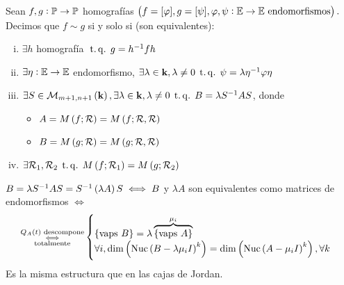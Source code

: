 \begin{defi}
	Sean $f, g : \mathbb{P} \to \mathbb{P}$ homografías $\left( f = [\varphi], g = [\psi], \varphi, \psi : \mathbb{E} \to \mathbb{E} \text{ endomorfismos}\right).$ Decimos que $f \sim g$ si y solo si (son equivalentes):
	\begin{enumerate}[(i)]
		\item $\exists h$ homografía $\operatorname{\;t.q.\;} g = h^{-1}fh$
		\item $\exists \eta : \mathbb{E} \to \mathbb{E}$ endomorfismo, $\exists \lambda \in \mathbf{k}, \lambda \neq 0 \operatorname{\;t.q.\;} \psi = \lambda \eta^{-1} \varphi \eta$
		\item $\exists S \in \mathcal{M}_{m+1, n+1}\left(\mathbf{k}\right), \exists \lambda\in\mathbf{k}, \lambda \neq 0 \operatorname{\;t.q.\;} B = \lambda S^{-1} A S$, donde
		\begin{itemize}
			\item $A = M\left( f; \mathcal{R}\right) = M\left( f; \mathcal{R},\mathcal{R}\right)$
			\item $B = M\left( g; \mathcal{R}\right) = M\left( g; \mathcal{R},\mathcal{R}\right)$
		\end{itemize}
		\item $\exists \mathcal{R}_1,\mathcal{R}_2\operatorname{\;t.q.\;} M\left( f;\mathcal{R}_1\right) = M \left( g; \mathcal{R}_2\right)$
	\end{enumerate}
\end{defi}
\begin{obs}
	$B = \lambda S^{-1} A S = S^{-1} \left( \lambda A \right) S \iff B$ y $\lambda A$ son equivalentes como matrices de endomorfismos $\iff$
	\[
		\substack{Q_A\left( t \right) \text{ descompone} \\ \iff \\ \text{totalmente}}
		\begin{cases}
			\{ \text{vaps } B \} = \lambda \overbrace{\{ \text{vaps } A \}}^{\mu_i} \\
			\forall i, \dim \left( \text{Nuc}\left( B - \lambda \mu_i I\right)^k \right) = \dim \left(\text{Nuc}\left( A - \mu_i I \right) ^k \right), \forall k
		\end{cases}
	\]
	Es la misma estructura que en las cajas de Jordan.
\end{obs}
